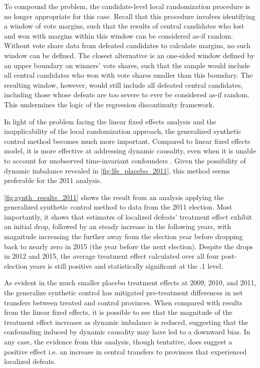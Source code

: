 \documentclass[12pt]{article}
\newcommand{\1}{\mathbbm{1}}
\begin{document}
To compound the problem, the candidate-level local randomization procedure is no longer appropriate for this case. Recall that this procedure involves identifying a window of vote margins, such that the results of central candidates who lost and won with margins within this window can be considered as-if random. Without vote share data from defeated candidates to calculate margins, no such window can be defined. The closest alternative is an one-sided window defined by an upper boundary on winners' vote shares, such that the sample would include all central candidates who won with vote shares smaller than this boundary. The resulting window, however, would still include all defeated central candidates, including those whose defeats are too severe to ever be considered as-if random. This undermines the logic of the regression discontinuity framework.

In light of the problem facing the linear fixed effects analysis and the inapplicability of the local randomization approach, the generalized synthetic control method \citep{Xu2017gsynth} becomes much more important. Compared to linear fixed effects model, it is more effective at addressing dynamic causality, even when it is unable to account for unobserved time-invariant confounders \autocite{ImaiKim2019}. Given the possibility of dynamic imbalance revealed in \autoref{fig:lfe_placebo_2011}, this method seems preferable for the 2011 analysis.

\autoref{fig:synth_results_2011} shows the result from an analysis applying the generalized synthetic control method \citep{Xu2017gsynth} to data from the 2011 election. Most importantly, it shows that estimates of localized defeats' treatment effect exhibit an initial drop, followed by an steady increase in the following years, with magnitude increasing the further away from the election year before dropping back to nearly zero in 2015 (the year before the next election). Despite the drops in 2012 and 2015, the average treatment effect calculated over all four post-election years is still positive and statistically significant at the .1 level. 

As evident in the much smaller placebo treatment effects at 2009, 2010, and 2011, the generalize synthetic control has mitigated pre-treatment differences in net transfers between treated and control provinces. When compared with results from the linear fixed effects, it is possible to see that the magnitude of the treatment effect increases as dynamic imbalance is reduced, suggesting that the confounding induced by dynamic causality may have led to a downward bias. In any case, the evidence from this analysis, though tentative, does suggest a positive effect i.e. an increase in central transfers to provinces that experienced localized defeats.
\end{document}
